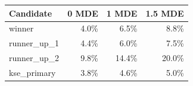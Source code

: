 \begin{tabular}{lrrr}
\toprule
Candidate & 0 MDE & 1 MDE & 1.5 MDE \\
\midrule
winner & 4.0\% & 6.5\% & 8.8\% \\
runner\_up\_1 & 4.4\% & 6.0\% & 7.5\% \\
runner\_up\_2 & 9.8\% & 14.4\% & 20.0\% \\
kse\_primary & 3.8\% & 4.6\% & 5.0\% \\
\bottomrule
\end{tabular}
